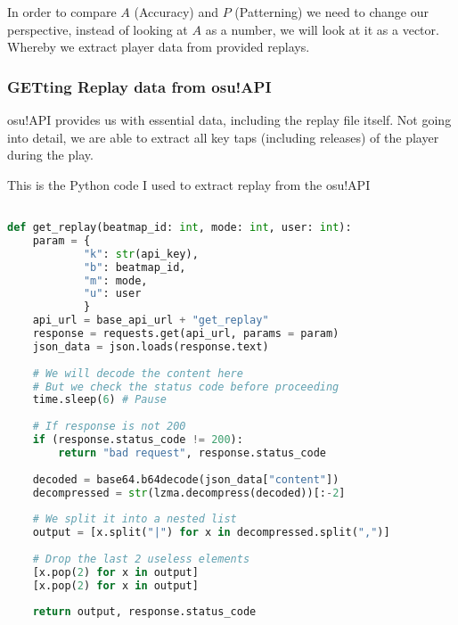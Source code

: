 \documentclass{article}
\begin{document}
In order to compare $A$ (Accuracy) and $P$ (Patterning) we need to change our perspective, instead of looking at $A$ as a number, we will look at it as a vector. Whereby we extract player data from provided replays.

\subsubsection{GETting Replay data from osu!API}

osu!API provides us with essential data, including the replay file itself. Not going into detail, we are able to extract all key taps (including releases) of the player during the play.

This is the Python code I used to extract replay from the osu!API

\begin{lstlisting}[language=Python]

def get_replay(beatmap_id: int, mode: int, user: int):
    param = {
            "k": str(api_key),
            "b": beatmap_id,
            "m": mode,
            "u": user
            }
    api_url = base_api_url + "get_replay"
    response = requests.get(api_url, params = param)
    json_data = json.loads(response.text)
    
    # We will decode the content here
    # But we check the status code before proceeding
    time.sleep(6) # Pause
    
    # If response is not 200
    if (response.status_code != 200):
        return "bad request", response.status_code
    
    decoded = base64.b64decode(json_data["content"])
    decompressed = str(lzma.decompress(decoded))[:-2]
    
    # We split it into a nested list
    output = [x.split("|") for x in decompressed.split(",")]
    
    # Drop the last 2 useless elements    
    [x.pop(2) for x in output]
    [x.pop(2) for x in output]
    
    return output, response.status_code
    
\end{lstlisting}
\end{document}
